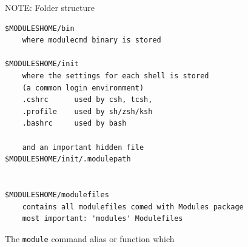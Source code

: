 \begin{mdframed}
NOTE: Folder structure
{\tiny
\begin{verbatim}
$MODULESHOME/bin
	where modulecmd binary is stored
	
$MODULESHOME/init
	where the settings for each shell is stored
	(a common login environment)
	.cshrc		used by csh, tcsh, 
	.profile	used by sh/zsh/ksh
	.bashrc		used by bash
	
	and an important hidden file 
$MODULESHOME/init/.modulepath
	
	
$MODULESHOME/modulefiles
	contains all modulefiles comed with Modules package
	most important: 'modules' Modulefiles
\end{verbatim}
}
\end{mdframed}



The \verb!module! command alias or function which 
  
